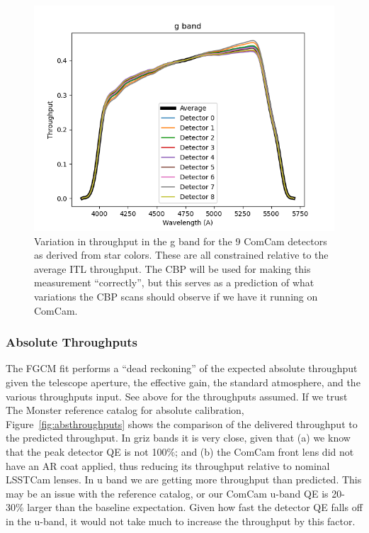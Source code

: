 \begin{figure}
  \includegraphics{photometric_calibration_figures/detector_chromaticity_g.png}
  \caption{Variation in throughput in the g band for the 9 ComCam detectors as
    derived from star colors. These are all constrained relative to the average
    ITL throughput. The CBP will be used for making this measurement
    ``correctly'', but this serves as a prediction of what variations the CBP
    scans should observe if we have it running on ComCam.}
\end{figure}

\subsubsection{Absolute Throughputs}

The FGCM fit performs a ``dead reckoning'' of the expected absolute throughput
given the telescope aperture, the effective gain, the standard atmosphere, and
the various throughputs input.  See above for the throughputs assumed.  If we
trust The Monster reference catalog for absolute calibration,
Figure~\ref{fig:absthroughputs} shows the comparison of the delivered
throughput to the predicted throughput.  In griz bands it is very close, given
that (a) we know that the peak detector QE is not 100\%; and (b) the ComCam
front lens did not have an AR coat applied, thus reducing its throughput
relative to nominal LSSTCam lenses.  In u band we are getting more throughput
than predicted.  This may be an issue with the reference catalog, or our ComCam
u-band QE is 20-30\% larger than the baseline expectation.  Given how fast the
detector QE falls off in the u-band, it would not take much to increase the
throughput by this factor.

